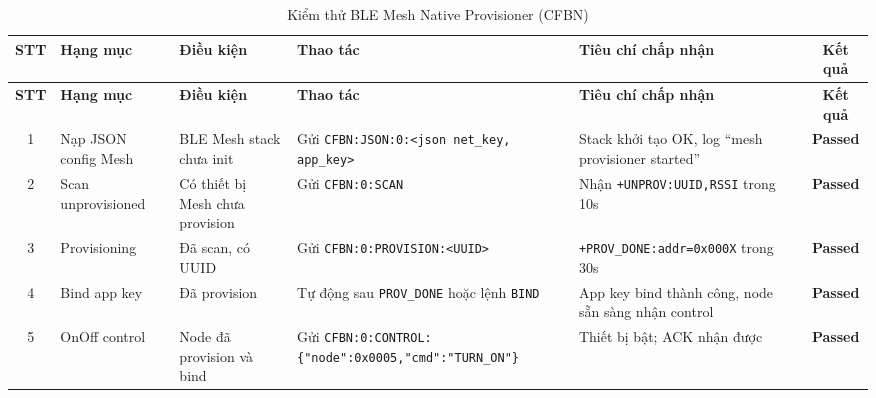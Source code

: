 
        \begin{longtable}{|c|p{}|p{}|p{}|p{}|c|}
            \caption{Kiểm thử BLE Mesh Native Provisioner (CFBN)}
            \label{tab:test_ble_mesh_native} \\
            \hline
            \textbf{STT} & \textbf{Hạng mục} & \textbf{Điều kiện} & \textbf{Thao tác} & \textbf{Tiêu chí chấp nhận} & \textbf{Kết quả} \\ \hline
            \endfirsthead
            \hline
            \textbf{STT} & \textbf{Hạng mục} & \textbf{Điều kiện} & \textbf{Thao tác} & \textbf{Tiêu chí chấp nhận} & \textbf{Kết quả} \\ \hline
            \endhead
            \hline
            \endfoot
            \endlastfoot
        
            1 & Nạp JSON config Mesh & BLE Mesh stack chưa init & Gửi \texttt{CFBN:JSON:0:}\newline\texttt{<json net\_key, app\_key>} & Stack khởi tạo OK, log ``mesh provisioner started'' & \textcolor{modern_blue}{\textbf{Passed}} \\ \hline
        
            2 & Scan unprovisioned & Có thiết bị Mesh chưa provision & Gửi \texttt{CFBN:0:SCAN} & Nhận \texttt{+UNPROV:}\newline\texttt{UUID,RSSI} trong 10s & \textcolor{modern_blue}{\textbf{Passed}} \\ \hline
        
            3 & Provisioning & Đã scan, có UUID & Gửi \texttt{CFBN:0:}\newline\texttt{PROVISION:<UUID>} & \texttt{+PROV\_DONE:}\newline\texttt{addr=0x000X} trong 30s & \textcolor{modern_blue}{\textbf{Passed}} \\ \hline
        
            4 & Bind app key & Đã provision & Tự động sau \texttt{PROV\_DONE} hoặc lệnh \texttt{BIND} & App key bind thành công, node sẵn sàng nhận control & \textcolor{modern_blue}{\textbf{Passed}} \\ \hline
        
            5 & OnOff control & Node đã provision và bind & Gửi \texttt{CFBN:0:CONTROL:}\newline\texttt{\{"node":0x0005,}\newline\texttt{"cmd":"TURN\_ON"\}} & Thiết bị bật; ACK nhận được & \textcolor{modern_blue}{\textbf{Passed}} \\ \hline
        

\end{longtable}
